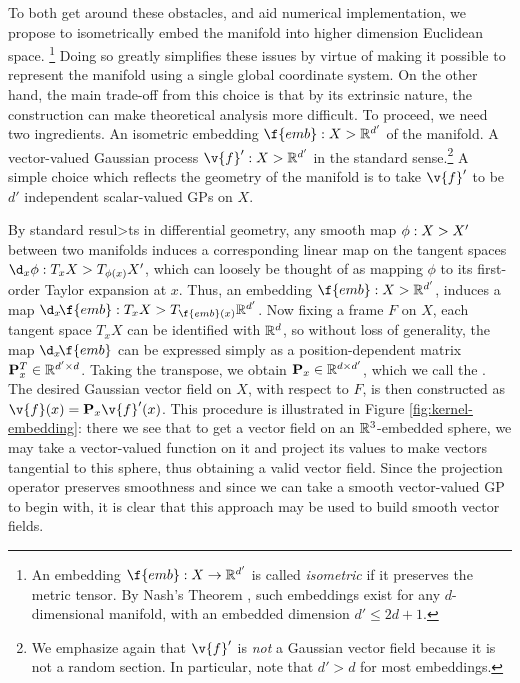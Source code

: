 To both get around these obstacles, and aid numerical implementation, we propose to isometrically embed the manifold into higher dimension Euclidean space.
\footnote{An embedding $\f{emb}: X \to \R^{d'}$ is called \emph{isometric} if it preserves the metric tensor.
	By Nash's Theorem \cite{lee2013smooth}, such embeddings exist for any $d$-dimensional manifold, with an embedded dimension $d' \leq 2d+1$.
}
Doing so greatly simplifies these issues by virtue of making it possible to represent the manifold using a single global coordinate system.
On the other hand, the main trade-off from this choice is that by its extrinsic nature, the construction can make theoretical analysis more difficult.
To proceed, we need two ingredients.
\1 An isometric embedding $\f{emb}: X \-> \R^{d'}$ of the manifold.
\2 A vector-valued Gaussian process $\v{f}': X \-> \R^{d'}$ in the standard sense.\footnote{We emphasize again that $\v{f}'$ is \emph{not} a Gaussian vector field because it is not a random section.
	In particular, note that $d' > d$ for most embeddings.
}
\0
A simple choice which reflects the geometry of the manifold is to take $\v{f}'$ to be $d'$ independent scalar-valued GPs on $X$.

By standard resul>ts in differential geometry, any smooth map $\phi : X \-> X'$ between two manifolds induces a corresponding linear map on the tangent spaces $\d_x\phi : T_xX \-> T_{\phi(x)}X'$, which can loosely be thought of as mapping $\phi$ to its first-order Taylor expansion at $x$.
Thus, an embedding $\f{emb}: X \-> \R^{d'}$, induces a map $\d_x\!
	\f{emb}: T_xX \-> T_{\f{emb}(x)}\R^{d'}$.
Now fixing a frame $F$ on $X$, each tangent space $T_xX$ can be identified with $\mathbb{R}^d$, so without loss of generality, the map $\d_x\!
	\f{emb}$ can be expressed simply as a position-dependent matrix $\m{P}_x^T \in \R^{d' \x d}$.
Taking the transpose, we obtain $\m{P}_x \in \R^{d \x d'}$, which we call the .
The desired Gaussian vector field on $X$, with respect to $F$, is then constructed as $\v{f}(x) = \m{P}_x \v{f}'(x)$.
This procedure is illustrated in Figure \ref{fig:kernel-embedding}: there we see that to get a vector field on an $\mathbb{R}^3$-embedded sphere, we may take a vector-valued function on it and project its values to make vectors tangential to this sphere, thus obtaining a valid vector field.
Since the projection operator preserves smoothness and since we can take a smooth vector-valued GP to begin with, it is clear that this approach may be used to build smooth vector fields.


